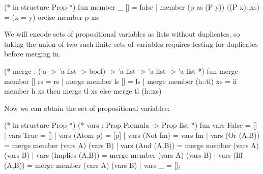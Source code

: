 \begin{node}[Syntax]
\begin{node}
\begin{node}
\begin{sml}
(* in structure Prop *)
fun member _ [] = false
 |  member (p as (P y)) ((P x)::xs) = (x = y) orelse member p xs;
\end{sml}
\end{node}

\begin{node}\label{prop:syntax-0003}%
We will encode sets of propositional variables as lists without
duplicates, so taking the union of two such finite sets of variables
requires testing for duplicates before merging in.

\begin{sml}
(* merge : ('a -> 'a list -> bool) -> 'a list -> 'a list -> 'a list *)
fun merge member [] rs = rs
 |  merge member ls [] = ls
 |  merge member (h::tl) xs = if member h xs
                              then merge tl xs
                              else merge tl (h::xs)
\end{sml}
\end{node}
\begin{node}\label{prop:syntax-0001}%
Now we can obtain the set of propositional variables:

\begin{sml}
(* in structure Prop *)
(* vars : Prop Formula -> Prop list *)
fun vars False = []
 |  vars True = []
 |  vars (Atom p) = [p]
 |  vars (Not fm) = vars fm
 |  vars (Or (A,B)) = merge member (vars A) (vars B)
 |  vars (And (A,B)) = merge member (vars A) (vars B)
 |  vars (Implies (A,B)) = merge member (vars A) (vars B)
 |  vars (Iff (A,B)) = merge member (vars A) (vars B)
 |  vars _ = [];
\end{sml}
\end{node}
\end{node}
\end{node}
